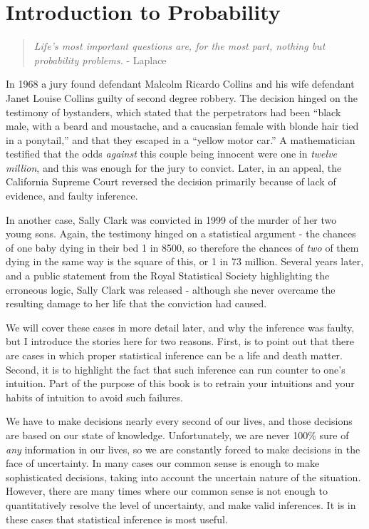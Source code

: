 \chapter{Introduction to Probability}\label{ch:intro}

\begin{quote}
{\em Life's most important questions are, for the most part, nothing but probability problems.} - Laplace
\end{quote}

In 1968 a jury found defendant Malcolm Ricardo Collins and his wife defendant Janet Louise Collins guilty of second degree robbery\cite{SULLIVAN:fk}.  The decision hinged on the testimony of bystanders, which stated that the perpetrators had been ``black male, with a beard and moustache, and a caucasian female with blonde hair tied in a ponytail,'' and that they escaped in a ``yellow motor car.''  A mathematician testified that the odds {\em against} this couple being innocent were one in {\em twelve million}, and this was enough for the jury to convict.  Later, in an appeal, the California Supreme Court reversed the decision primarily because of lack of evidence, and faulty inference.  

In another case, Sally Clark was convicted in 1999 of the murder of her two young sons\cite{KAY:2003uq}. Again, the testimony hinged on a statistical argument - the chances of one baby dying in their bed 1 in 8500, so therefore the chances of {\em two} of them dying in the same way is the square of this, or 1 in 73 million.  Several years later, and a public statement from the Royal Statistical Society highlighting the erroneous logic, Sally Clark was released - although she never overcame the resulting damage to her life that the conviction had caused.

We will cover these cases in more detail later, and why the inference was faulty, but I introduce the stories here for two reasons.  First, is to point out that there are cases in which proper statistical inference can be a life and death matter.  Second, it is to highlight the fact that such inference can run counter to one's intuition.  Part of the purpose of this book is to retrain your intuitions and your habits of intuition to avoid such failures.

We have to make decisions nearly every second of our lives, and those decisions are based on our state of knowledge.  Unfortunately, we are never 100\% sure of {\em any} information in our lives, so we are constantly forced to make decisions in the face of uncertainty.  In many cases our common sense is enough to make sophisticated decisions, taking into account the uncertain nature of the situation.  However, there are many times where our common sense is not enough to quantitatively resolve the level of uncertainty, and make valid inferences.  It is in these cases that statistical inference is most useful.  

